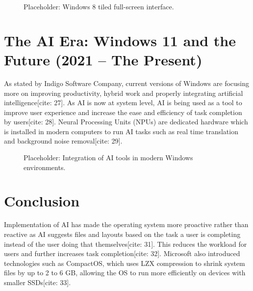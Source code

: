 \documentclass[12pt]{report}
\begin{document}
\begin{figure}[htbp]
    \centering
    \caption{Placeholder: Windows 8 tiled full-screen interface.}
    \label{chap1:fig:windows_8}
\end{figure}

\section{The AI Era: Windows 11 and the Future (2021 – The Present)}
\label{chap1:sec:ai_era}
As stated by Indigo Software Company, current versions of Windows are focusing more on improving productivity, hybrid work and properly integrating artificial intelligence[cite: 27]. As AI is now at system level, AI is being used as a tool to improve user experience and increase the ease and efficiency of task completion by users[cite: 28]. Neural Processing Units (NPUs) are dedicated hardware which is installed in modern computers to run AI tasks such as real time translation and background noise removal[cite: 29].

\begin{figure}[htbp]
    \centering
    \caption{Placeholder: Integration of AI tools in modern Windows environments.}
    \label{chap1:fig:windows_ai}
\end{figure}

\section{Conclusion}
\label{chap1:sec:conclusion}
Implementation of AI has made the operating system more proactive rather than reactive as AI suggests files and layouts based on the task a user is completing instead of the user doing that themselves[cite: 31]. This reduces the workload for users and further increases task completion[cite: 32]. Microsoft also introduced technologies such as CompactOS, which uses LZX compression to shrink system files by up to 2 to 6 GB, allowing the OS to run more efficiently on devices with smaller SSDs[cite: 33].
\end{document}
